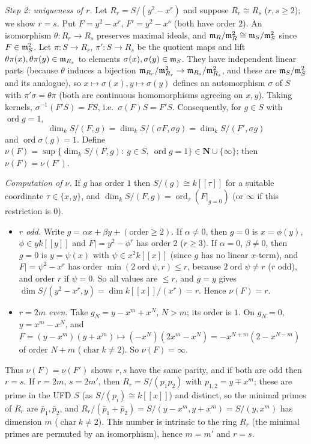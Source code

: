 \documentclass[11pt]{article}
\begin{document}
\emph{Step 2: uniqueness of $r$.} Let $R_r=S/(y^2-x^r)$ and suppose $R_r\cong R_s$ ($r,s\ge2$); we show $r=s$. Put $F=y^2-x^r$, $F'=y^2-x^s$ (both have order $2$). An isomorphism $\theta:R_r\to R_s$ preserves maximal ideals, and $\mathfrak m_R/\mathfrak m_R^2\cong\mathfrak m_S/\mathfrak m_S^2$ since $F\in\mathfrak m_S^2$. Let $\pi:S\to R_r$, $\pi':S\to R_s$ be the quotient maps and lift $\theta\pi(x),\theta\pi(y)\in\mathfrak m_{R_s}$ to elements $\sigma(x),\sigma(y)\in\mathfrak m_S$. They have independent linear parts (because $\theta$ induces a bijection $\mathfrak m_{R_r}/\mathfrak m_{R_r}^2\to\mathfrak m_{R_s}/\mathfrak m_{R_s}^2$, and these are $\mathfrak m_S/\mathfrak m_S^2$ and its analogue), so $x\mapsto\sigma(x),y\mapsto\sigma(y)$ defines an automorphism $\sigma$ of $S$ with $\pi'\sigma=\theta\pi$ (both are continuous homomorphisms agreeing on $x,y$). Taking kernels, $\sigma^{-1}(F'S)=FS$, i.e.\ $\sigma(F)S=F'S$. Consequently, for $g\in S$ with $\operatorname{ord}g=1$,
\[
\dim_kS/(F,g)=\dim_kS/(\sigma F,\sigma g)=\dim_kS/(F',\sigma g)
\]
and $\operatorname{ord}\sigma(g)=1$. Define $\nu(F)=\sup\{\dim_kS/(F,g):\ g\in S,\ \operatorname{ord}g=1\}\in\mathbf N\cup\{\infty\}$; then $\nu(F)=\nu(F')$.

\emph{Computation of $\nu$.} If $g$ has order $1$ then $S/(g)\cong k[[\tau]]$ for a suitable coordinate $\tau\in\{x,y\}$, and $\dim_kS/(F,g)=\operatorname{ord}_\tau(F|_{g=0})$ (or $\infty$ if this restriction is $0$).

\begin{itemize}
\item \emph{$r$ odd.} Write $g=\alpha x+\beta y+(\text{order}\ge2)$. If $\alpha\neq0$, then $g=0$ is $x=\phi(y)$, $\phi\in yk[[y]]$ and $F|=y^2-\phi^r$ has order $2$ ($r\ge3$). If $\alpha=0$, $\beta\ne0$, then $g=0$ is $y=\psi(x)$ with $\psi\in x^2k[[x]]$ (since $g$ has no linear $x$-term), and $F|=\psi^2-x^r$ has order $\min(2\operatorname{ord}\psi,r)\le r$, because $2\operatorname{ord}\psi\ne r$ ($r$ odd), and order $r$ if $\psi=0$. So all values are $\le r$, and $g=y$ gives $\dim S/(y^2-x^r,y)=\dim k[[x]]/(x^r)=r$. Hence $\nu(F)=r$.
\item \emph{$r=2m$ even.} Take $g_N=y-x^m+x^N$, $N>m$; its order is $1$. On $g_N=0$, $y=x^m-x^N$, and $F=(y-x^m)(y+x^m)\mapsto(-x^N)(2x^m-x^N)=-x^{N+m}(2-x^{N-m})$ of order $N+m$ ($\operatorname{char}k\neq2$). So $\nu(F)=\infty$.
\end{itemize}
Thus $\nu(F)=\nu(F')$ shows $r,s$ have the same parity, and if both are odd then $r=s$. If $r=2m$, $s=2m'$, then $R_r=S/(p_1p_2)$ with $p_{1,2}=y\mp x^m$; these are prime in the UFD $S$ (as $S/(p_i)\cong k[[x]]$) and distinct, so the minimal primes of $R_r$ are $\bar p_1,\bar p_2$, and $R_r/(\bar p_1+\bar p_2)=S/(y-x^m,y+x^m)=S/(y,x^m)$ has dimension $m$ ($\operatorname{char}k\ne2$). This number is intrinsic to the ring $R_r$ (the minimal primes are permuted by an isomorphism), hence $m=m'$ and $r=s$.
\end{document}
